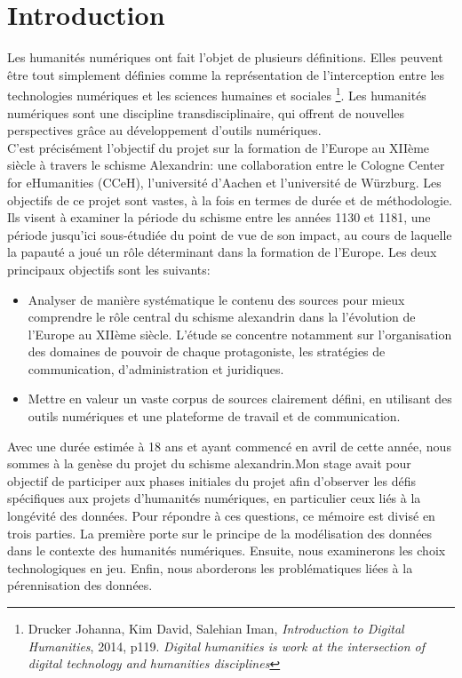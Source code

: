 \chapter{Introduction}

Les humanités numériques ont fait l’objet de plusieurs définitions. Elles peuvent être tout simplement définies comme la représentation de l’interception entre les technologies numériques et les sciences humaines et sociales \footnote{Drucker Johanna, Kim David, Salehian Iman, \textit{Introduction to Digital Humanities}, 2014, p119. \og \textit{Digital humanities is work at the intersection of digital technology and humanities disciplines} \fg{}}. Les humanités numériques sont une discipline transdisciplinaire, qui offrent de nouvelles perspectives grâce au développement d’outils numériques.\\
C'est précisément l'objectif du projet sur la formation de l'Europe au XIIème siècle à travers le schisme Alexandrin:  une collaboration entre le Cologne Center for eHumanities (CCeH), l'université d'Aachen et l'université de Würzburg. Les objectifs de ce projet sont vastes, à la fois en termes de durée et de méthodologie. Ils visent à examiner la période du schisme entre les années 1130 et 1181, une période jusqu'ici sous-étudiée du point de vue de son impact, au cours de laquelle la papauté a joué un rôle déterminant dans la formation de l'Europe. Les deux principaux objectifs sont les suivants:\\
\begin{itemize}
    \item Analyser de manière systématique le contenu des sources pour mieux comprendre le rôle central du schisme alexandrin dans la l'évolution  de l'Europe au XIIème siècle. L'étude se concentre notamment sur l'organisation des domaines de pouvoir de chaque protagoniste, les stratégies de communication, d'administration et juridiques.
    \item Mettre en valeur un vaste corpus de sources clairement défini, en utilisant des outils numériques et une plateforme de travail et de communication.\\
\end{itemize}

Avec une durée estimée à 18 ans et ayant commencé en avril de cette année, nous sommes à la genèse du projet du schisme alexandrin.Mon stage avait pour objectif de participer aux phases initiales du projet afin d'observer les défis spécifiques aux projets d’humanités numériques, en particulier ceux liés à la longévité des données. Pour répondre à ces questions, ce mémoire est divisé en trois parties. La première porte sur le principe de la modélisation des données dans le contexte des humanités numériques. Ensuite, nous examinerons les choix technologiques en jeu. Enfin, nous aborderons les problématiques liées à la pérennisation des données.


